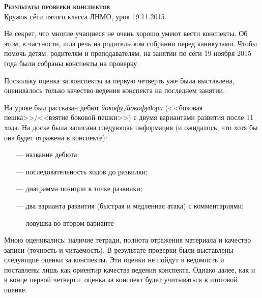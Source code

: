 \documentclass[10pt,a4paper]{article}
\begin{document}
\begin{center}{\bfseries\Large\scshape Результаты проверки конспектов}\\
Кружок сёги пятого класса ЛНМО, урок 19.11.2015
\end{center}

\noindent
Не секрет, что многие учащиеся не очень хорошо умеют вести конспекты.
Об этом, в частности, шла речь на родительском собрании перед каникулами.
Чтобы помочь детям, родителям и преподавателям, на занятии по сёги 
19 ноября 2015 года были собраны конспекты на проверку.

\medskip\noindent
Поскольку оценка за конспекты за первую четверть уже была выставлена, оценивалось только
качество ведения конспекта на последнем занятии.

\medskip\noindent
На уроке был рассказан дебют \emph{йокофу/йокофудори}
(<<боковая пешка>>/<<взятие боковой пешки>>) с двумя вариантами развития после 11 хода.
На доске была записана следующая информация (и ожидалось, что хотя бы она будет отражена в конспекте):
\begin{itemize}
\setlength{\parskip}{-1ex}\relax
\item[---] название дебюта;
\item[---] последовательность ходов до развилки;
\item[---] диаграмма позиции в точке развилки;
\item[---] два варианта развития (быстрая и медленная атака) с комментариями;
\item[---] ловушка во втором варианте
\end{itemize}

\noindent
Мною оценивались: наличие тетради, полнота отражения материала и качество записи (точность и читаемость).
В результате проверки были выставлены следующие оценки за конспекты. Эти оценки не пойдут в ведомость и
поставлены лишь как ориентир качества ведения конспекта. Однако далее, как и в конце первой четверти, 
оценка за конспект будет учитываться в итоговой оценке.
\end{document}
